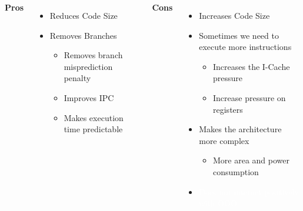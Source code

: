     \begin{columns}[t] %
            \textbf{Pros}
            \begin{itemize}
                \item Reduces Code Size
                \item Removes Branches
                \begin{itemize}
                    \item Removes branch misprediction penalty
                    \item Improves IPC
                    \item Makes execution time predictable
                \end{itemize}
            \end{itemize}

            \textbf{Cons}
            \begin{itemize}
                \item Increases Code Size
                \item Sometimes we need to execute more instructions
                \begin{itemize}
                    \item Increases the I-Cache pressure
                    \item Increase pressure on registers
                \end{itemize}
                \item Makes the architecture more complex
                \begin{itemize}
                    \item More area and power consumption
                \end{itemize}
                \item \textcolor{white}{Does not interact positively with OOO}
                
                
            \end{itemize}
    \end{columns}
    